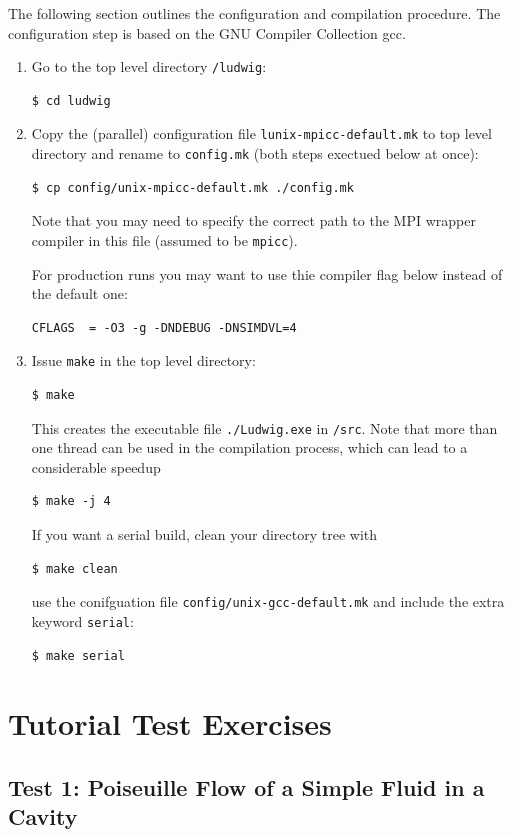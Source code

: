 \documentclass[11pt,twoside,a4paper]{article}
\begin{document}
The following section outlines the configuration and compilation 
procedure. The configuration step is based on the GNU Compiler Collection gcc.
\begin{enumerate}
\item Go to the top level directory \texttt{/ludwig}:
\begin{lstlisting}
$ cd ludwig
\end{lstlisting}
\item Copy the (parallel) configuration file \texttt{lunix-mpicc-default.mk}
to top level directory 
and rename to \texttt{config.mk} (both steps exectued below at once):
\begin{lstlisting}
$ cp config/unix-mpicc-default.mk ./config.mk
\end{lstlisting}
Note that you may need to specify the correct path to the MPI wrapper compiler
in this file (assumed to be \texttt{mpicc}).

For production runs you may want to use thie compiler flag below instead of the default one:
\begin{lstlisting}
CFLAGS  = -O3 -g -DNDEBUG -DNSIMDVL=4
\end{lstlisting}
\item Issue \texttt{make} in the top level directory:
\begin{lstlisting}
$ make 
\end{lstlisting}
This creates the executable file \texttt{./Ludwig.exe} in \texttt{/src}. 
Note that more than one thread can be used in the compilation process,
which can lead to a considerable speedup  
\begin{lstlisting}
$ make -j 4
\end{lstlisting} 
If you want a serial build, clean your directory tree with
\begin{lstlisting}
$ make clean
\end{lstlisting}
use the conifguation file
\texttt{config/unix-gcc-default.mk} and include the extra keyword \texttt{serial}:
\begin{lstlisting}
$ make serial
\end{lstlisting}
\end{enumerate}

\section{Tutorial Test Exercises}

\subsection{Test 1: Poiseuille Flow of a Simple Fluid in a Cavity}
\end{document}
